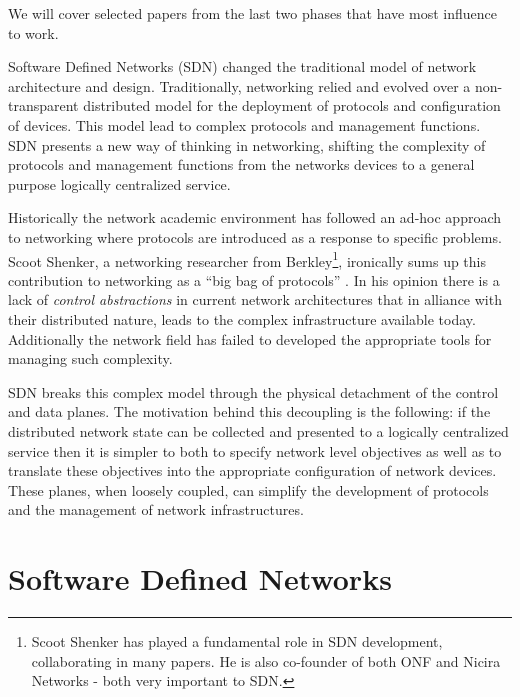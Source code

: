 


We will cover selected papers from the last two phases that have most influence to work. 



Software Defined Networks (SDN) changed the traditional model of network architecture and design. 
Traditionally, networking  relied and evolved over a non-transparent distributed model for
the deployment  of  protocols and configuration of devices. 
This model lead to complex protocols and management functions. 
SDN presents a new way of thinking in networking, shifting the complexity of protocols and management functions from  the  networks devices to a general purpose logically centralized service. 

Historically  the network academic environment has followed an  ad-hoc approach to networking where protocols are introduced as a response to specific problems. 
Scoot Shenker, a networking researcher from Berkley\footnote{Scoot Shenker has played a fundamental role in SDN development, collaborating in many papers. He is also co-founder of both ONF \cite{onf} and Nicira Networks - both very important to SDN.}, ironically sums up  this contribution to networking as a ``big bag of protocols'' \cite{Shenker:2011ys}. 
In his opinion there is a lack of \emph{control abstractions} in current network architectures that in alliance  with  their  distributed nature, leads to the  complex infrastructure available today. 
Additionally the network field has failed to developed the appropriate tools for managing such complexity. 

SDN breaks this complex model through the physical detachment of the control and data planes.  
The motivation behind this decoupling is the following: if the distributed network state can be collected and presented to a logically centralized service then it is simpler to both to specify network level objectives as well as to translate these objectives into the appropriate configuration of network devices. 
These planes, when loosely coupled, can simplify the development of protocols and the management of network infrastructures. 


\section{Software Defined Networks}
\glsresetall
\label{sec:background:sdn}

